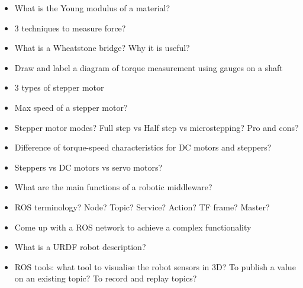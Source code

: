 \documentclass[compress]{beamer}
\begin{document}
\begin{frame}[plain]
    \begin{center}
        \begin{itemize}
        \item {What is the Young modulus of a material?}
        \item {3 techniques to measure force?}
        \item {What is a Wheatstone bridge? Why it is useful?}
        \item {Draw and label a diagram of torque measurement using gauges on a shaft}
        \end{itemize}
    \end{center}
\end{frame}

\begin{frame}[plain]
    \begin{center}
        \begin{itemize}
        \item {3 types of stepper motor}
        \item {Max speed of a stepper motor?}
        \item {Stepper motor modes? Full step vs Half step vs microstepping? Pro and cons?}
        \item {Difference of torque-speed characteristics for DC motors and steppers?}
        \item {Steppers vs DC motors vs servo motors?}
        \end{itemize}
    \end{center}
\end{frame}

\begin{frame}[plain]
    \begin{center}
        \begin{itemize}
        \item {What are the main functions of a robotic middleware?}
        \item {ROS terminology? Node? Topic? Service? Action? TF frame? Master?}
        \item {Come up with a ROS network to achieve a complex functionality}
        \item {What is a URDF robot description?}
        \item {ROS tools: what tool to visualise the robot sensors in 3D? To publish a value on an existing topic? To record and replay topics?}
        \end{itemize}
    \end{center}
\end{frame}
\end{document}
